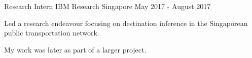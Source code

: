 \begin{cventries}
    \cventry
    {Research Intern} %
    {IBM Research} %
    {Singapore} %
    {May 2017 - August 2017} %
    {
        \begin{cvitems} %
            \item Led a research endeavour focusing on destination inference in the Singaporean public transportation network.
            \item My work was later  as part of a larger project.
        \end{cvitems}
    }
\end{cventries}

